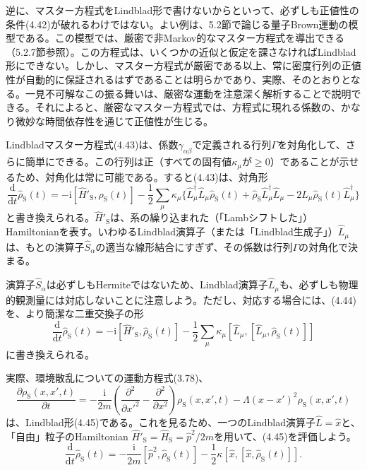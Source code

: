 \hypertarget{srcpage:167}{}\label{srcpage:167}
逆に、マスター方程式をLindblad形で書けないからといって、必ずしも正値性の条件(4.42)が破れるわけではない。よい例は、5.2節で論じる量子Brown運動の模型である。この模型では、厳密で非Markov的なマスター方程式を導出できる（5.2.7節参照）。この方程式は、いくつかの近似と仮定を課さなければLindblad形にできない\cite{ref183}。しかし、マスター方程式が厳密である以上、常に密度行列の正値性が自動的に保証されるはずであることは明らかであり、実際、そのとおりとなる。一見不可解なこの振る舞いは、厳密な運動を注意深く解析することで説明できる。それによると、厳密なマスター方程式では、方程式に現れる係数の、かなり微妙な時間依存性を通じて正値性が生じる\cite{ref184,ref185}。

Lindbladマスター方程式(4.43)は、係数$\gamma_{\alpha\beta}$で定義される行列$\Gamma$を対角化して、さらに簡単にできる。この行列は正（すべての固有値$\kappa_\mu$が$\geq0$）であることが示せるため、対角化は常に可能である。すると(4.43)は、対角形\cite{ref177,ref179}
\begin{equation}
\frac{\mathrm d}{\mathrm dt}\hat\rho_{\mathrm S}(t)
=-\mathrm i[\hat H'_{\mathrm S},\hat\rho_{\mathrm S}(t)]
-\frac12\sum_\mu\kappa_\mu\{\hat L_\mu^{\dagger}\hat L_\mu\hat\rho_{\mathrm S}(t)
+\hat\rho_{\mathrm S}\hat L_\mu^{\dagger}\hat L_\mu-2\hat L_\mu\hat\rho_{\mathrm S}(t)\hat L_\mu^{\dagger}\}
\tag{4.44}
\end{equation}
と書き換えられる。$\hat H'_{\mathrm S}$は、系の繰り込まれた（「Lambシフトした」）Hamiltonianを表す。いわゆるLindblad演算子（または「Lindblad生成子」）$\hat L_\mu$は、もとの演算子$\hat S_\alpha$の適当な線形結合にすぎず、その係数は行列$\Gamma$の対角化で決まる。

演算子$\hat S_\alpha$は必ずしもHermiteではないため、Lindblad演算子$\hat L_\mu$も、必ずしも物理的観測量には対応しないことに注意しよう。ただし、対応する場合には、(4.44)を、より簡潔な二重交換子の形
\begin{equation}
\frac{\mathrm d}{\mathrm dt}\hat\rho_{\mathrm S}(t)
=-\mathrm i[\hat H'_{\mathrm S},\hat\rho_{\mathrm S}(t)]
-\frac12\sum_\mu\kappa_\mu[\hat L_\mu,[\hat L_\mu,\hat\rho_{\mathrm S}(t)]]
\tag{4.45}
\end{equation}
に書き換えられる。

実際、環境散乱についての運動方程式(3.78)、
\begin{equation}
\frac{\partial\rho_{\mathrm S}(x,x',t)}{\partial t}
=-\frac{\mathrm i}{2m}\left(\frac{\partial^2}{\partial x'^2}-\frac{\partial^2}{\partial x^2}\right)\rho_{\mathrm S}(x,x',t)
-\Lambda(x-x')^2\rho_{\mathrm S}(x,x',t)
\tag{4.46}
\end{equation}
は、Lindblad形(4.45)である。これを見るため、一つのLindblad演算子$\hat L=\hat x$と、「自由」粒子のHamiltonian $\hat H'_{\mathrm S}=\hat H_{\mathrm S}=\hat p^2/2m$を用いて、(4.45)を評価しよう。
\begin{equation}
\frac{\mathrm d}{\mathrm dt}\hat\rho_{\mathrm S}(t)=-\frac{\mathrm i}{2m}[\hat p^2,\hat\rho_{\mathrm S}(t)]-\frac12\kappa[\hat x,[\hat x,\hat\rho_{\mathrm S}(t)]].
\tag{4.47}
\end{equation}

